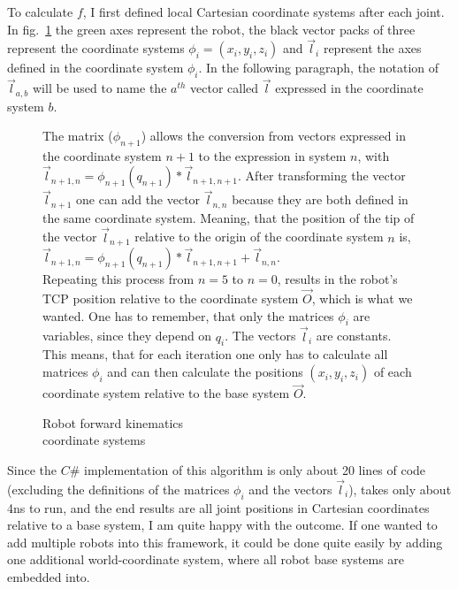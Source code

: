 To calculate $f$, I first defined local Cartesian coordinate systems after each joint. In fig.~\ref{Fig:ForwardKinematics} the green axes represent the robot, the black vector packs of three represent the coordinate systems $\phi_i = (x_i, y_i, z_i)$ and $\vec{l}_i$ represent the axes defined in the coordinate system $\phi_i$. In the following paragraph, the notation of  $\vec{l}_{a,b}$ will be used to name the $a^{th}$ vector called $\vec{l}$ expressed in the coordinate system $b$.

\begin{figure}[!h]
	\begin{minipage}{0.45\textwidth}
		\centering
		
		\caption{Robot forward kinematics\\coordinate systems}
		\label{Fig:ForwardKinematics}
	\end{minipage}\hfill
	\begin{minipage}{0.45\textwidth}
		The matrix ($\phi_{n+1}$) allows the conversion from vectors expressed in the coordinate system $n + 1$ to the expression in system $n$, with $\vec{l}_{n+1,n} = \phi_{n+1}(q_{n+1}) * \vec{l}_{n+1,n+1}$. After transforming the vector $\vec{l}_{n+1}$ one can add the vector $\vec{l}_{n,n}$ because they are both defined in the same coordinate system. Meaning, that the position of the tip of the vector $\vec{l}_{n+1}$ relative to the origin of the coordinate system $n$ is, $\vec{l}_{n+1,n} = \phi_{n+1}(q_{n+1}) * \vec{l}_{n+1,n+1} + \vec{l}_{n,n} $.\\
		Repeating this process from $n = 5$ to $n = 0$, results in the robot's TCP position relative to the coordinate system $\vec{O}$, which is what we wanted. One has to remember, that only the matrices $\phi_{i}$ are variables, since they depend on $q_i$. The vectors $\vec{l}_i$ are constants. This means, that for each iteration one only has to calculate all matrices $\phi_i$ and can then calculate the positions $(x_i, y_i, z_i)$ of each coordinate system relative to the base system $\vec{O}$.
	\end{minipage}
\end{figure}
\FloatBarrier

Since the $C\#$ implementation of this algorithm is only about 20 lines of code (excluding the definitions of the matrices $\phi_i$ and the vectors $\vec{l}_i$), takes only about 4ns to run, and the end results are all joint positions in Cartesian coordinates relative to a base system, I am quite happy with the outcome. If one wanted to add multiple robots into this framework, it could be done quite easily by adding one additional world-coordinate system, where all robot base systems are embedded into.
	
